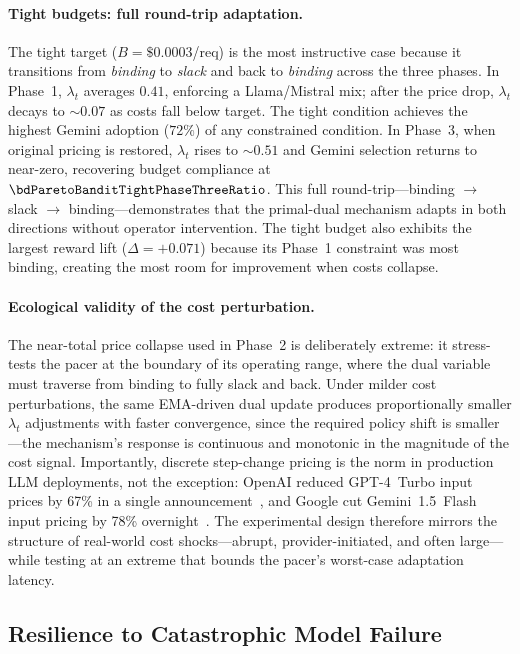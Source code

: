 \paragraph{Tight budgets: full round-trip adaptation.}
The tight target ($B{=}\$0.0003$/req) is the most instructive case because it transitions from \emph{binding} to \emph{slack} and back to \emph{binding} across the three phases.
In Phase~1, $\lambda_t$ averages $0.41$, enforcing a Llama/Mistral mix; after the price drop, $\lambda_t$ decays to ${\sim}0.07$ as costs fall below target.
The tight condition achieves the highest Gemini adoption ($72\%$) of any constrained condition.
In Phase~3, when original pricing is restored, $\lambda_t$ rises to ${\sim}0.51$ and Gemini selection returns to near-zero, recovering budget compliance at $\bdParetoBanditTightPhaseThreeRatio$.
This full round-trip---binding $\to$ slack $\to$ binding---demonstrates that the primal-dual mechanism adapts in both directions without operator intervention.
The tight budget also exhibits the largest reward lift ($\Delta{=}+0.071$) because its Phase~1 constraint was most binding, creating the most room for improvement when costs collapse.

\paragraph{Ecological validity of the cost perturbation.}
The near-total price collapse used in Phase~2 is deliberately extreme: it stress-tests the pacer at the boundary of its operating range, where the dual variable must traverse from binding to fully slack and back.
Under milder cost perturbations, the same EMA-driven dual update produces proportionally smaller $\lambda_t$ adjustments with faster convergence, since the required policy shift is smaller---the mechanism's response is continuous and monotonic in the magnitude of the cost signal.
Importantly, discrete step-change pricing is the norm in production LLM deployments, not the exception: OpenAI reduced GPT-4~Turbo input prices by 67\% in a single announcement~\cite{openai2025turbopricing}, and Google cut Gemini~1.5~Flash input pricing by 78\% overnight~\cite{google2024flashpricing}.
The experimental design therefore mirrors the structure of real-world cost shocks---abrupt, provider-initiated, and often large---while testing at an extreme that bounds the pacer's worst-case adaptation latency.

\subsection{Resilience to Catastrophic Model Failure}
\label{sec:exp3_catastrophic_failure}

